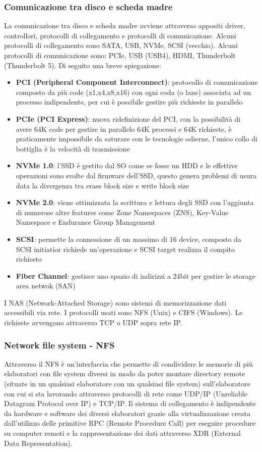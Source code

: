 \documentclass[a4paper]{article}
\begin{document}
\subsubsection*{Comunicazione tra disco e scheda madre}
La comunicazione tra disco e scheda madre avviene attraverso appositi driver, controllori, protocolli di collegamento e protocolli
di comunicazione. Alcuni protocolli di collegamento sono SATA, USB, NVMe, SCSI (vecchio). Alcuni protocolli di comunicazione sono:
PCIe, USB (USB4), HDMI, Thunderbolt (Thunderbolt 5). Di seguito una breve spiegazione:
\begin{itemize}
	\item \textbf{PCI (Peripheral Component Interconnect)}: protocollo di comunicazione composto da più code (x1,x4,x8,x16) con
	ogni coda (o lane) associata ad un processo indipendente, per cui è possibile gestire più richieste in parallelo
	\item \textbf{PCIe (PCI Express)}: nuova ridefinizione del PCI, con la possibilità di avere 64K code per gestire in parallelo
	64K processi e 64K richieste, è praticamente impossibile da saturare con le tecnologie odierne, l'unico collo di bottiglia
	è la velocità di trasmissione
	\item \textbf{NVMe 1.0}: l'SSD è gestito dal SO come se fosse un HDD e le effettive operazioni sono svolte dal firmware
	dell'SSD, questo genera problemi di usura data la divergenza tra erase block size e write block size
	\item \textbf{NVMe 2.0}: viene ottimizzata la scrittura e lettura degli SSD con l'aggiunta di numerose altre features come
	Zone Namespaces (ZNS), Key-Value Namespace e Endurance Group Management
	\item \textbf{SCSI}: permette la connessione di un massimo di 16 device, composto da SCSI initiatior richiede un'operazione
	e SCSI target realizza il compito richiesto
	\item \textbf{Fiber Channel}: gestisce uno spazio di indirizzi a 24bit per gestire le storage area netwok (SAN)
\end{itemize}
I NAS (Network-Attached Storage) sono sistemi di memorizzazione dati accessibili via rete. I protocolli usati sono NFS (Unix) e
CIFS (Windows). Le richieste avvengono attraverso TCP o UDP sopra rete IP.

\subsubsection*{Network file system - NFS}
Attraverso il NFS è un'interfaccia che permette di condividere le memorie di più elaboratori con file system diversi in modo da
poter montare directory remote (situate in un qualsiasi elaboratore con un qualsiasi file system) sull'elaboratore con cui si sta
lavorando attraverso protocolli di rete come UDP/IP (Unreliable Datagram Protocol over IP) e TCP/IP. Il sistema di collegamento
è indipendente da hardware e software dei diversi elaboratori grazie alla virtualizzazione creata dall'utilizzo delle primitive
RPC (Remote Procedure Call) per eseguire procedure su computer remoti e la rappresentazione dei dati attraverso XDR (External
Data Representation).
\end{document}
